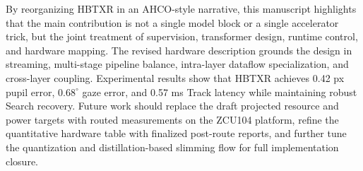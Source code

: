 \documentclass[journal]{IEEEtran}
\begin{document}
By reorganizing HBTXR in an AHCO-style narrative, this manuscript highlights that the main contribution is not a single model block or a single accelerator trick, but the joint treatment of supervision, transformer design, runtime control, and hardware mapping. The revised hardware description grounds the design in streaming, multi-stage pipeline balance, intra-layer dataflow specialization, and cross-layer coupling. Experimental results show that HBTXR achieves 0.42 px pupil error, $0.68^{\circ}$ gaze error, and 0.57 ms Track latency while maintaining robust Search recovery. Future work should replace the draft projected resource and power targets with routed measurements on the ZCU104 platform, refine the quantitative hardware table with finalized post-route reports, and further tune the quantization and distillation-based slimming flow for full implementation closure.
\end{document}
